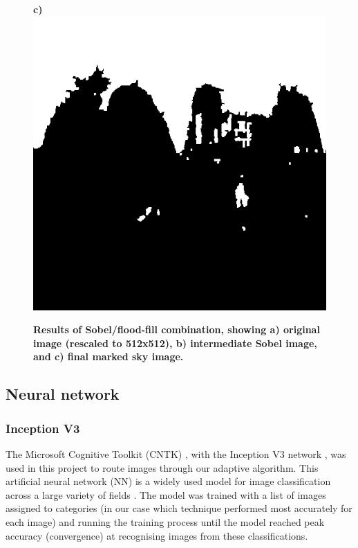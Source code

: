 \documentclass[final,3p,times,authoryear]{elsarticle}
\begin{document}
\begin{figure}
\textbf{c)}\includegraphics[scale=0.27]{Images/2/FloodfillOutput.png}
\caption{\bf   Results of Sobel/flood-fill combination, showing a) original image (rescaled to 512x512), b) intermediate Sobel image, and c) final marked sky image.}    
 \label{fig:sobelflood}  
\end{figure} 

\subsection{Neural network}\label{sec:nn}

\subsubsection{Inception V3}\label{sec:inception}
The Microsoft Cognitive Toolkit (CNTK) \citep{Yu2015,Agarwal2016}, with the Inception V3 network \citep{Szegedy2015a}, was used in this project to route images through our adaptive algorithm. This artificial neural network (NN) is a widely used model for image classification across a large variety of fields \citep{Xia2017,Hassannejad2016}. The model was trained with a list of images assigned to categories (in our case which technique performed most accurately for each image) and running the training process until the model reached peak accuracy (convergence) at recognising images from these classifications.
\end{document}
